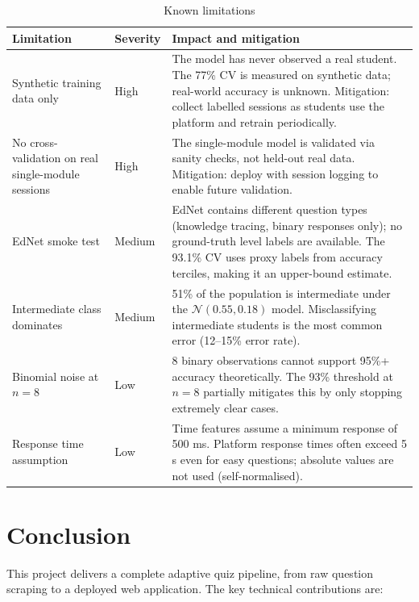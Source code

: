 \documentclass[12pt,a4paper]{article}
\begin{document}
\begin{table}[H]
\centering
\caption{Known limitations}
\begin{tabular}{@{}p{3.5cm}p{3cm}p{7cm}@{}}
\toprule
Limitation & Severity & Impact and mitigation \\
\midrule
Synthetic training data only &
High &
The model has never observed a real student. The 77\% CV is measured on synthetic data;
real-world accuracy is unknown. Mitigation: collect labelled sessions as students use
the platform and retrain periodically. \\[4pt]
No cross-validation on real single-module sessions &
High &
The single-module model is validated via sanity checks, not held-out real data.
Mitigation: deploy with session logging to enable future validation. \\[4pt]
EdNet smoke test &
Medium &
EdNet contains different question types (knowledge tracing, binary responses only);
no ground-truth level labels are available. The 93.1\% CV uses proxy labels from
accuracy terciles, making it an upper-bound estimate. \\[4pt]
Intermediate class dominates &
Medium &
51\% of the population is intermediate under the $\mathcal{N}(0.55, 0.18)$ model.
Misclassifying intermediate students is the most common error (12--15\% error rate). \\[4pt]
Binomial noise at $n=8$ &
Low &
8 binary observations cannot support 95\%+ accuracy theoretically. The 93\%
threshold at $n=8$ partially mitigates this by only stopping extremely clear cases. \\[4pt]
Response time assumption &
Low &
Time features assume a minimum response of 500 ms. Platform response times often
exceed 5 s even for easy questions; absolute values are not used (self-normalised). \\
\bottomrule
\end{tabular}
\end{table}

\section{Conclusion}
\label{sec:conclusion}

This project delivers a complete adaptive quiz pipeline, from raw question scraping to
a deployed web application. The key technical contributions are:
\end{document}
